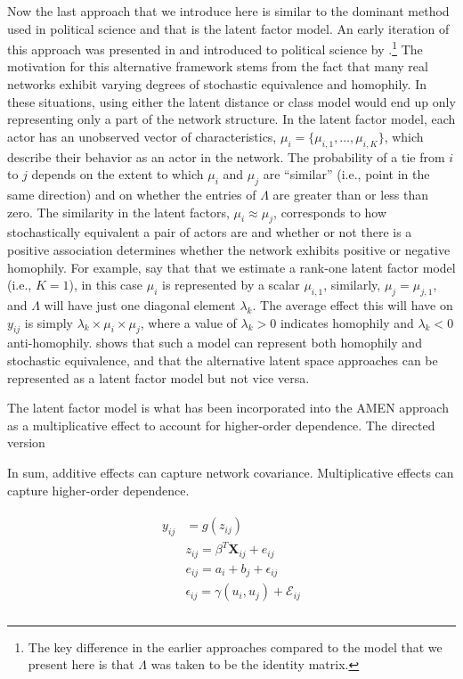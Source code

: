 Now the last approach that we introduce here is similar to the dominant method used in political science and that is the latent factor model. An early iteration of this approach was presented in \citet{hoff:2005} and introduced to political science by \citet{hoff:ward:2004}.\footnote{The key difference in the earlier approaches compared to the model that we present here is that $\Lambda$ was taken to be the identity matrix.} The motivation for this alternative framework stems from the fact that many real networks exhibit varying degrees of stochastic equivalence and homophily. In these situations, using either the latent distance or class model would end up only representing only a part of the network structure. In the latent factor model, each actor has an unobserved vector of characteristics, $\mu_{i} = \{\mu_{i,1}, \ldots, \mu_{i,K} \}$, which describe their behavior as an actor in the network. The probability of a tie from $i$ to $j$ depends on the extent to which $\mu_{i}$ and $\mu_{j}$ are ``similar'' (i.e., point in the same direction) and on whether the entries of $\Lambda$ are greater than or less than zero. The similarity in the latent factors, $\mu_{i} \approx \mu_{j}$, corresponds to how stochastically equivalent a pair of actors are and whether or not there is a positive association determines whether the network exhibits positive or negative homophily. For example, say that that we estimate a rank-one latent factor model (i.e., $K=1$), in this case $\mu_{i}$ is represented by a scalar $\mu_{i,1}$, similarly, $\mu_{j}=\mu_{j,1}$, and $\Lambda$ will have just one diagonal element $\lambda_{k}$. The average effect this will have on $y_{ij}$ is simply $\lambda_{k} \times \mu_{i} \times \mu_{j}$, where a value of $\lambda_{k}>0$ indicates homophily and $\lambda_{k}<0$ anti-homophily. \citet{hoff:2008} shows that such a model can represent both homophily and stochastic equivalence, and that the alternative latent space approaches can be represented as a latent factor model but not vice versa. 

The latent factor model is what has been incorporated into the AMEN approach as a multiplicative effect to account for higher-order dependence. The directed version 

In sum, additive effects can capture network covariance. Multiplicative effects can capture higher-order dependence. 

\begin{align}
\begin{aligned}
	y_{ij} &= g(z_{ij}) \\ 
	&z_{ij} = \beta^{T} \mathbf{X}_{ij} + e_{ij} \\
	&e_{ij} = a_{i} + b_{j} + \epsilon_{ij} \\
	&\epsilon_{ij} = \gamma(u_{i}, u_{j}) + \mathcal{E}_{ij} \\
\end{aligned}
\end{align}

